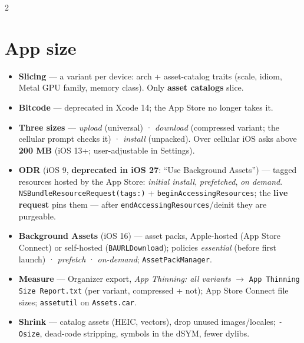 \documentclass[8pt]{extarticle}
\begin{document}

\begin{multicols}{2}
\raggedright

\section{App size}
\begin{itemize}
  \item \textbf{Slicing} — a variant per device: arch + asset-catalog traits (scale,
        idiom, Metal GPU family, memory class). Only \textbf{asset catalogs} slice.
  \item \textbf{Bitcode} — deprecated in Xcode 14; the App Store no longer takes it.
  \item \textbf{Three sizes} — \emph{upload} (universal) · \emph{download} (compressed
        variant; the cellular prompt checks it) · \emph{install} (unpacked). Over cellular
        iOS asks above \textbf{200 MB} (iOS 13+; user-adjustable in Settings).
  \item \textbf{ODR} (iOS 9, \textbf{deprecated in iOS 27}: ``Use Background Assets'') —
        tagged resources hosted by the App Store: \emph{initial install},
        \emph{prefetched}, \emph{on demand}. \texttt{NSBundleResourceRequest(tags:)} +
        \texttt{beginAccessingResources}; the \textbf{live request} pins them — after
        \texttt{endAccessingResources}/deinit they are purgeable.
  \item \textbf{Background Assets} (iOS 16) — asset packs, Apple-hosted (App Store
        Connect) or self-hosted (\texttt{BAURLDownload}); policies \emph{essential}
        (before first launch) · \emph{prefetch} · \emph{on-demand}; \texttt{AssetPackManager}.
  \item \textbf{Measure} — Organizer export, \emph{App Thinning: all variants} $\to$
        \texttt{App Thinning Size Report.txt} (per variant, compressed + not); App Store
        Connect file sizes; \texttt{assetutil} on \texttt{Assets.car}.
  \item \textbf{Shrink} — catalog assets (HEIC, vectors), drop unused images/locales;
        \texttt{-Osize}, dead-code stripping, symbols in the dSYM, fewer dylibs.
\end{itemize}


\end{multicols}
\end{document}
